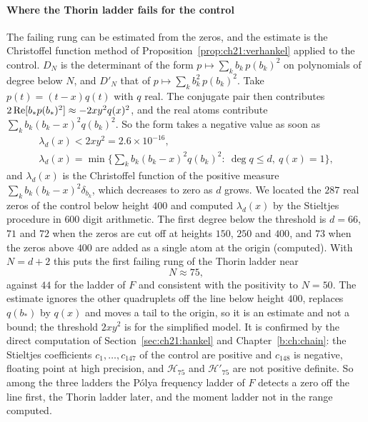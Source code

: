 \paragraph{Where the Thorin ladder fails for the control} The failing rung can be estimated from the zeros, and the estimate is the Christoffel function method of Proposition~\ref{prop:ch21:verhankel} applied to the control. $D_N$ is the determinant of the form $p\mapsto\sum_kb_k\,p(b_k)^2$ on polynomials of degree below $N$, and $D'_N$ that of $p\mapsto\sum_kb_k^2\,p(b_k)^2$. Take $p(t)=(t-x)q(t)$ with $q$ real. The conjugate pair then contributes $2\operatorname{Re}[b_*p(b_*)^2]\approx-2xy^2q(x)^2$, and the real atoms contribute $\sum_kb_k(b_k-x)^2q(b_k)^2$. So the form takes a negative value as soon as
\begin{gather*}
\lambda_d(x)<2xy^2=2.6\times10^{-16},\\
\lambda_d(x)=\min\Big\{\sum_kb_k(b_k-x)^2q(b_k)^2:\ \deg q\le d,\ q(x)=1\Big\},
\end{gather*}
and $\lambda_d(x)$ is the Christoffel function of the positive measure $\sum_kb_k(b_k-x)^2\delta_{b_k}$, which decreases to zero as $d$ grows. We located the $287$ real zeros of the control below height $400$ and computed $\lambda_d(x)$ by the Stieltjes procedure in $600$ digit arithmetic. The first degree below the threshold is $d=66$, $71$ and $72$ when the zeros are cut off at heights $150$, $250$ and $400$, and $73$ when the zeros above $400$ are added as a single atom at the origin (computed). With $N=d+2$ this puts the first failing rung of the Thorin ladder near
\[
N\approx75 ,
\]
against $44$ for the ladder of $F$ and consistent with the positivity to $N=50$. The estimate ignores the other quadruplets off the line below height $400$, replaces $q(b_*)$ by $q(x)$ and moves a tail to the origin, so it is an estimate and not a bound; the threshold $2xy^2$ is for the simplified model. It is confirmed by the direct computation of Section~\ref{sec:ch21:hankel} and Chapter~\ref{b:ch:chain}: the Stieltjes coefficients $c_1,\dots,c_{147}$ of the control are positive and $c_{148}$ is negative, floating point at high precision, and $\mathcal H_{75}$ and $\mathcal H'_{75}$ are not positive definite. So among the three ladders the P\'olya frequency ladder of $F$ detects a zero off the line first, the Thorin ladder later, and the moment ladder not in the range computed.

